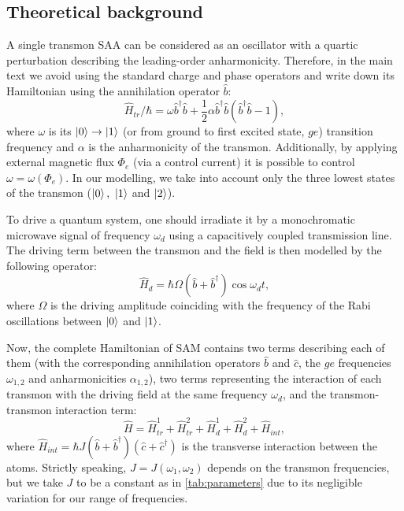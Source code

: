 \documentclass[%
 prx,
 amsmath,amssymb,
 reprint,%
]{revtex4-1}
\begin{document}
\subsection{Theoretical background}

A single transmon SAA can be considered as an oscillator with a quartic perturbation describing the leading-order anharmonicity. Therefore, in the main text we avoid using the standard charge and phase operators and write down its Hamiltonian using the annihilation operator $\hat b$:
\begin{equation}
\hat{{H}}_{tr}/\hbar = \omega \hat b^{\dagger}\hat b +\frac{1}{2}\alpha \hat b^{\dagger}\hat b(\hat b^{\dagger}\hat b-1),
\end{equation}
where $\omega$ is its $\ket{0}\rightarrow\ket{1}$ (or from ground to first excited state, $ge$) transition frequency and $\alpha$ is the anharmonicity of the transmon. Additionally, by applying external magnetic flux $\Phi_e$ (via a control current) it is possible to control $\omega = \omega(\Phi_e)$\cite{koch2007charge}. In our modelling, we take into account only the three lowest states of the transmon ($\ket{0},\ \ket{1}$ and $\ket{2}$).

To drive a quantum system, one should irradiate it by a monochromatic microwave signal of frequency $\omega_d$ using a capacitively coupled transmission line. The driving term between the transmon and the field is then modelled by the following operator: 
\begin{equation}
\hat H_{d} = \hbar \Omega (\hat b+\hat b^{\dagger}) \cos\omega_d t,
\end{equation}
where $\Omega$ is the driving amplitude coinciding with the frequency of the Rabi oscillations between $\ket{0}$ and $\ket{1}$.

Now, the complete Hamiltonian of SAM contains two terms describing each of them (with the corresponding annihilation operators $\hat b$ and $\hat c$, the $ge$ frequencies $\omega_{1,2}$ and anharmonicities $\alpha_{1,2}$), two terms representing the interaction of each transmon with the driving field at the same frequency $\omega_d$, and the transmon-transmon interaction term:
\begin{equation}\label{Hsystem}
\hat H = \hat H_{tr}^{1}+\hat H_{tr}^{2}+\hat H_{d}^1+\hat H_{d}^2+\hat H_{int},
\end{equation}
where $\hat H_{int} = \hbar J (\hat b +\hat b^\dag)(\hat c+\hat c^{\dagger})$ is the transverse interaction between the atoms. Strictly speaking, $J = J(\omega_1, \omega_2)$ depends on the transmon frequencies\cite{koch2007charge}, but we take $J$ to be a constant as in \autoref{tab:parameters} due to its negligible variation for our range of frequencies. 
\end{document}
